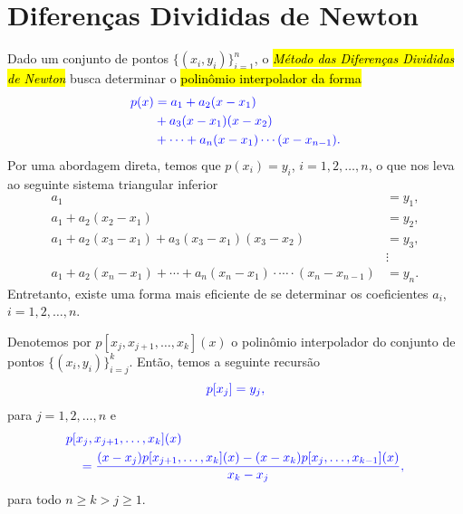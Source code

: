 \section{Diferenças Divididas de Newton}\label{cap_interp_sec_difdiv}

Dado um conjunto de pontos $\{(x_i, y_i)\}_{i=1}^n$, o \hl{\emph{Método das Diferenças Divididas de Newton}}{\newton} busca determinar o \hl{polinômio interpolador da forma}
\begin{equation}\color{blue}\begin{aligned}
    p(x) &= a_1 + a_2(x-x_1) \\
    &+ a_3(x-x_1)(x-x_2)\\
    &+ \cdots + a_{n}(x-x_1) \cdots (x-x_{n-1}).
  \end{aligned}
\end{equation}
Por uma abordagem direta, temos que $p(x_i)=y_i$, $i=1, 2, \dotsc, n$, o que nos leva ao seguinte sistema triangular inferior
\begin{subequations}
  \begin{align}
    a_1 &= y_1, \\
    a_1 + a_2(x_2-x_1) &= y_2, \\
    a_1 + a_2(x_3-x_1) + a_3(x_3-x_1)(x_3-x_2) &= y_3, \\
        &\vdots\\
    a_1 + a_2(x_n-x_1) + \cdots + a_{n}(x_n-x_1)\cdot\cdots\cdot(x_n-x_{n-1}) &= y_n.
  \end{align}
\end{subequations}
Entretanto, existe uma forma mais eficiente de se determinar os coeficientes $a_i$, $i=1, 2, \dotsc, n$.

Denotemos por $p[x_j, x_{j+1}, \dotsc, x_{k}](x)$ o polinômio interpolador do conjunto de pontos $\{(x_i, y_i)\}_{i=j}^k$. Então, temos a seguinte recursão
\begin{equation}\label{cap_interp_sec_difdiv:eq:interp_parc1}\color{blue}p[x_j] = y_j,
\end{equation}
para $j=1, 2, \dotsc, n$ e
\begin{equation}\label{cap_interp_sec_difdiv:eq:interp_parc2}\color{blue}\begin{aligned}
    &p[x_j, x_{j+1}, \ldots, x_k](x)\\
    &\quad = \frac{(x-x_j)p[x_{j+1},\dotsc,x_k](x)-(x-x_k)p[x_j,\dotsc,x_{k-1}](x)}{x_k-x_j},
  \end{aligned}
\end{equation}
para todo $n\geq k > j \geq 1$.

